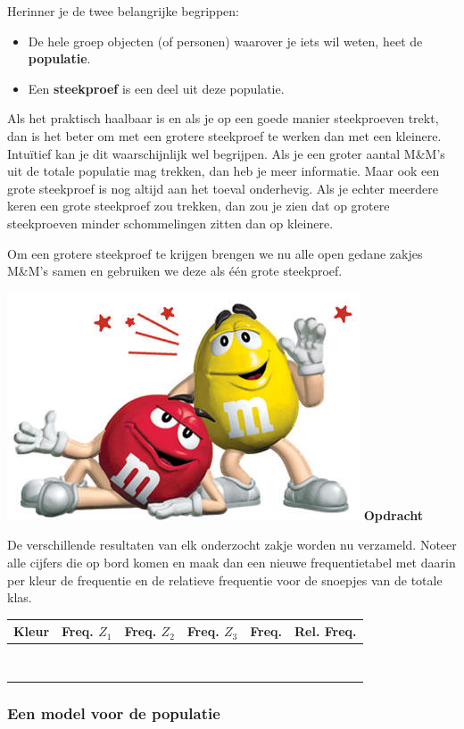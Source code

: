 \documentclass[12pt,twoside]{article}
\newcounter{nmmopdracht}
\newenvironment{mmopdracht}
{
  \stepcounter{nmmopdracht}
  \vspace*{0.7cm}
  \begin{minipage}{\textwidth}
  {%
  \hspace*{-\marginparwidth}\includegraphics[width=\marginparwidth]{mmopdracht}
  \large\bf Opdracht \arabic{nmmopdracht}}
}{%
  \end{minipage}
}
\begin{document}
Herinner je de twee belangrijke begrippen:
\begin{itemize}
  \item De hele groep objecten (of personen) waarover je iets wil weten, heet de {\bf populatie}.
  \item Een {\bf steekproef} is een deel uit deze populatie.
\end{itemize}

Als het praktisch haalbaar is en als je op een goede manier steekproeven trekt, dan is het beter om
met een grotere steekproef te werken dan met een kleinere. Intuïtief kan je dit waarschijnlijk wel
begrijpen. Als je een groter aantal M\&M’s uit de totale populatie mag trekken, dan heb je meer
informatie. Maar ook een grote steekproef is nog altijd aan het toeval onderhevig. Als je echter
meerdere keren een grote steekproef zou trekken, dan zou je zien dat op grotere steekproeven minder
schommelingen zitten dan op kleinere.

Om een grotere steekproef te krijgen brengen we nu alle open gedane zakjes M\&M's samen en gebruiken
we deze als één grote steekproef.

\begin{mmopdracht}
De verschillende resultaten van elk onderzocht zakje worden nu verzameld. Noteer alle
cijfers die op bord komen en maak dan een nieuwe frequentietabel met daarin per kleur de
frequentie en de relatieve frequentie voor de snoepjes van de totale klas.
\begin{center}
  \begin{tabular}{p{2cm}|p{1cm}|p{1cm}|p{1cm}|p{1.5cm}|p{1.5cm}}
    Kleur&Freq. $Z_1$ & Freq. $Z_2$ & Freq. $Z_3$ & Freq. &Rel. Freq.\\
    \hline
    &&&&\\
    \hline
    &&&&\\
    \hline
    &&&&\\
    \hline
    &&&&\\
    \hline
    &&&&\\
    \hline
    &&&&\\
    \hline
    &&&&\\
    \hline
    &&&&\\
  \end{tabular}
\end{center}
\end{mmopdracht}

\subsubsection{Een model voor de populatie}
\end{document}
